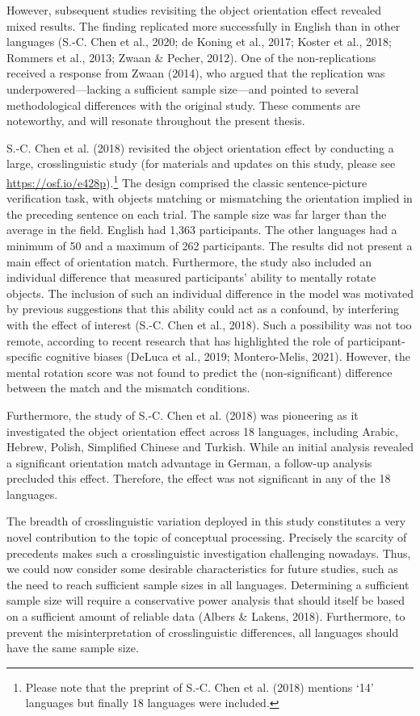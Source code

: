 \documentclass[
  12pt,
  man,floatsintext]{apa7}
\begin{document}
However, subsequent studies revisiting the object orientation effect revealed mixed results. The finding replicated more successfully in English than in other languages (S.-C. Chen et al., 2020; de Koning et al., 2017; Koster et al., 2018; Rommers et al., 2013; Zwaan \& Pecher, 2012). One of the non-replications received a response from Zwaan (2014), who argued that the replication was underpowered---lacking a sufficient sample size---and pointed to several methodological differences with the original study. These comments are noteworthy, and will resonate throughout the present thesis.

S.-C. Chen et al. (2018) revisited the object orientation effect by conducting a large, crosslinguistic study (for materials and updates on this study, please see \url{https://osf.io/e428p}).\footnote{Please note that the preprint of S.-C. Chen et al. (2018) mentions `14' languages but finally 18 languages were included.} The design comprised the classic sentence-picture verification task, with objects matching or mismatching the orientation implied in the preceding sentence on each trial. The sample size was far larger than the average in the field. English had 1,363 participants. The other languages had a minimum of 50 and a maximum of 262 participants. The results did not present a main effect of orientation match. Furthermore, the study also included an individual difference that measured participants' ability to mentally rotate objects. The inclusion of such an individual difference in the model was motivated by previous suggestions that this ability could act as a confound, by interfering with the effect of interest (S.-C. Chen et al., 2018). Such a possibility was not too remote, according to recent research that has highlighted the role of participant-specific cognitive biases (DeLuca et al., 2019; Montero-Melis, 2021). However, the mental rotation score was not found to predict the (non-significant) difference between the match and the mismatch conditions.

Furthermore, the study of S.-C. Chen et al. (2018) was pioneering as it investigated the object orientation effect across 18 languages, including Arabic, Hebrew, Polish, Simplified Chinese and Turkish. While an initial analysis revealed a significant orientation match advantage in German, a follow-up analysis precluded this effect. Therefore, the effect was not significant in any of the 18 languages.

The breadth of crosslinguistic variation deployed in this study constitutes a very novel contribution to the topic of conceptual processing. Precisely the scarcity of precedents makes such a crosslinguistic investigation challenging nowadays. Thus, we could now consider some desirable characteristics for future studies, such as the need to reach sufficient sample sizes in all languages. Determining a sufficient sample size will require a conservative power analysis that should itself be based on a sufficient amount of reliable data (Albers \& Lakens, 2018). Furthermore, to prevent the misinterpretation of crosslinguistic differences, all languages should have the same sample size.
\end{document}
